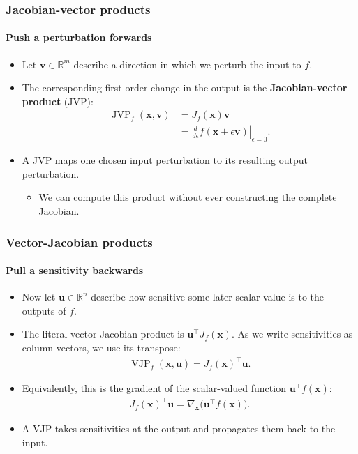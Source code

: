 \documentclass[]{article}
\begin{document}
\begin{frame}
\frametitle{Jacobian-vector products}
\framesubtitle{Push a perturbation forwards}
\begin{itemize}
	\item<+-> Let $\bm v\in\mathbb{R}^m$ describe a direction in which we perturb the input to $f$.
	\item<+-> The corresponding first-order change in the output is the \textbf{Jacobian-vector product} (JVP):
	\begin{align*}
		\operatorname{JVP}_f(\bm x,\bm v)
		&=J_f(\bm x)\bm v \\
		&=\left.\frac{d}{d\epsilon}f(\bm x+\epsilon\bm v)\right|_{\epsilon=0}.
	\end{align*}
	\item<+-> A JVP maps one chosen input perturbation to its resulting output perturbation.
	\begin{itemize}
		\item<+-> We can compute this product without ever constructing the complete Jacobian.
	\end{itemize}
\end{itemize}
\end{frame}

\begin{frame}
\frametitle{Vector-Jacobian products}
\framesubtitle{Pull a sensitivity backwards}
\begin{itemize}
	\item<+-> Now let $\bm u\in\mathbb{R}^n$ describe how sensitive some later scalar value is to the outputs of $f$.
	\item<+-> The literal vector-Jacobian product is $\bm u^\top J_f(\bm x)$. As we write sensitivities as column vectors, we use its transpose:
	\begin{align*}
		\operatorname{VJP}_f(\bm x,\bm u)=J_f(\bm x)^\top\bm u.
	\end{align*}
	\item<+-> Equivalently, this is the gradient of the scalar-valued function $\bm u^\top f(\bm x)$:
	\begin{align*}
		J_f(\bm x)^\top\bm u=\nabla_{\bm x}\bigl(\bm u^\top f(\bm x)\bigr).
	\end{align*}
	\item<+-> A VJP takes sensitivities at the output and propagates them back to the input.
\end{itemize}
\end{frame}
\end{document}
